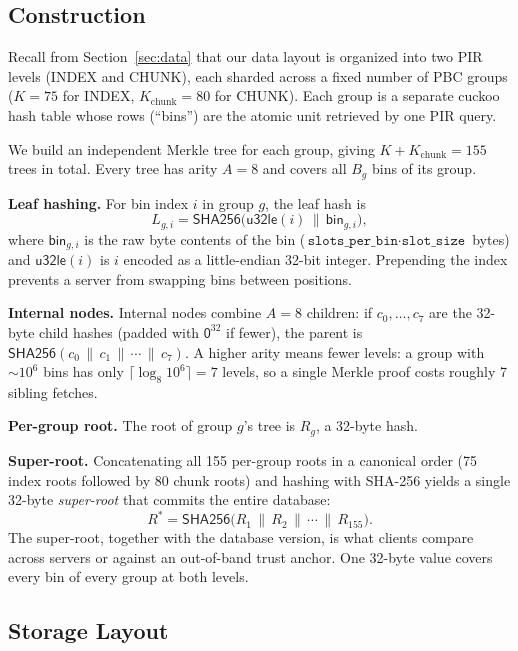 \subsection{Construction}

Recall from Section~\ref{sec:data} that our data layout is organized into two PIR levels (INDEX and CHUNK), each sharded across a fixed number of PBC groups (\mbox{$K{=}75$} for INDEX, \mbox{$K_\text{chunk}{=}80$} for CHUNK). Each group is a separate cuckoo hash table whose rows (``bins'') are the atomic unit retrieved by one PIR query.

We build an independent Merkle tree for each group, giving $K + K_\text{chunk} = 155$ trees in total. Every tree has arity $A = 8$ and covers all $B_g$ bins of its group.

\textbf{Leaf hashing.} For bin index $i$ in group $g$, the leaf hash is
$$L_{g,i} = \mathsf{SHA256}\bigl(\mathsf{u32le}(i) \,\|\, \mathsf{bin}_{g,i}\bigr),$$
where $\mathsf{bin}_{g,i}$ is the raw byte contents of the bin ($\texttt{slots\_per\_bin} \cdot \texttt{slot\_size}$ bytes) and $\mathsf{u32le}(i)$ is $i$ encoded as a little-endian 32-bit integer. Prepending the index prevents a server from swapping bins between positions.

\textbf{Internal nodes.} Internal nodes combine $A = 8$ children: if $c_0, \ldots, c_7$ are the 32-byte child hashes (padded with $\mathsf{0}^{32}$ if fewer), the parent is $\mathsf{SHA256}(c_0 \,\|\, c_1 \,\|\, \cdots \,\|\, c_7)$. A higher arity means fewer levels: a group with $\sim\!10^6$ bins has only $\lceil \log_8 10^6 \rceil = 7$ levels, so a single Merkle proof costs roughly 7 sibling fetches.

\textbf{Per-group root.} The root of group $g$'s tree is $R_g$, a 32-byte hash.

\textbf{Super-root.} Concatenating all 155 per-group roots in a canonical order (75 index roots followed by 80 chunk roots) and hashing with SHA-256 yields a single 32-byte \emph{super-root} that commits the entire database:
$$R^* = \mathsf{SHA256}\bigl(R_1 \,\|\, R_2 \,\|\, \cdots \,\|\, R_{155}\bigr).$$
The super-root, together with the database version, is what clients compare across servers or against an out-of-band trust anchor. One 32-byte value covers every bin of every group at both levels.

\subsection{Storage Layout}
\label{sec:merkle-storage}

